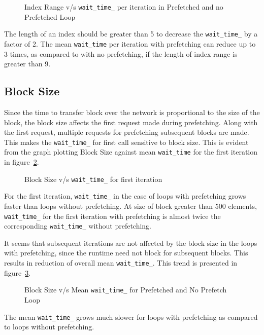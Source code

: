 \begin{figure}[h]
  
  \caption{Index Range v/s \texttt{wait\_time\_} per iteration in Prefetched and no Prefetched Loop}
  \label{fig:p_np_mean}
\end{figure}

The length of an index should be greater than 5 to decrease the \texttt{wait\_time\_}
by a factor of 2. The mean \texttt{wait\_time} per iteration with prefetching can
reduce up to 3 times, as compared to with no prefetching, if the length of index
range is greater than 9.

\subsection{Block Size}
Since the time to transfer block over the network is proportional to the size of the block, the
block size affects the first request made during prefetching. Along with the first
request, multiple requests for prefetching subsequent blocks are made. This makes
the \texttt{wait\_time\_} for first call sensitive to block size. This is evident
from the graph plotting Block Size against mean \texttt{wait\_time} for the first
iteration in figure~\ref{fig:first_wait_time}.
\begin{figure}[h]
  
  \caption{Block Size v/s \texttt{wait\_time\_} for first iteration}
  \label{fig:first_wait_time}
\end{figure}

For the first iteration, \texttt{wait\_time\_} in the case of loops with prefetching
grows faster than loops without prefetching. At size of block
greater than 500 elements, \texttt{wait\_time\_} for the first iteration with prefetching
is almost twice the corresponding \texttt{wait\_time\_} without prefetching.

It seems that subsequent iterations are not affected by the block size in the loops
with prefetching, since the runtime need not block for subsequent blocks. This results in reduction
of overall mean \texttt{wait\_time\_}. This trend is presented in figure~\ref{fig:block_size_avg_wait_time}.

\begin{figure}[h]
  
  \caption{Block Size v/s Mean \texttt{wait\_time\_} for Prefetched and No Prefetch Loop}
  \label{fig:block_size_avg_wait_time}
\end{figure}

The mean \texttt{wait\_time\_} grows much slower for loops with prefetching as compared
to loops without prefetching.

